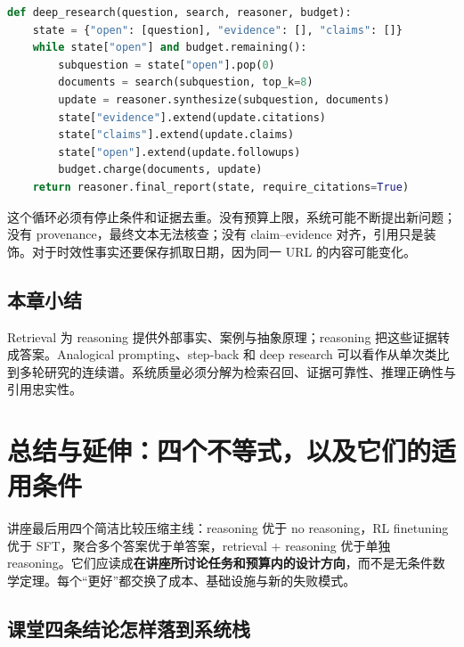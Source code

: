 \documentclass[a4paper]{article}
\begin{document}
\begin{lstlisting}[language=Python,caption={带 provenance 与停止条件的 retrieval-reasoning 循环}]
def deep_research(question, search, reasoner, budget):
    state = {"open": [question], "evidence": [], "claims": []}
    while state["open"] and budget.remaining():
        subquestion = state["open"].pop(0)
        documents = search(subquestion, top_k=8)
        update = reasoner.synthesize(subquestion, documents)
        state["evidence"].extend(update.citations)
        state["claims"].extend(update.claims)
        state["open"].extend(update.followups)
        budget.charge(documents, update)
    return reasoner.final_report(state, require_citations=True)
\end{lstlisting}

这个循环必须有停止条件和证据去重。没有预算上限，系统可能不断提出新问题；没有 provenance，最终文本无法核查；没有 claim--evidence 对齐，引用只是装饰。对于时效性事实还要保存抓取日期，因为同一 URL 的内容可能变化。


\subsection{本章小结}

Retrieval 为 reasoning 提供外部事实、案例与抽象原理；reasoning 把这些证据转成答案。Analogical prompting、step-back 和 deep research 可以看作从单次类比到多轮研究的连续谱。系统质量必须分解为检索召回、证据可靠性、推理正确性与引用忠实性。

\section{总结与延伸：四个不等式，以及它们的适用条件}

讲座最后用四个简洁比较压缩主线：reasoning 优于 no reasoning，RL finetuning 优于 SFT，聚合多个答案优于单答案，retrieval + reasoning 优于单独 reasoning。它们应读成\textbf{在讲座所讨论任务和预算内的设计方向}，而不是无条件数学定理。每个“更好”都交换了成本、基础设施与新的失败模式。

\subsection{课堂四条结论怎样落到系统栈}
\end{document}
